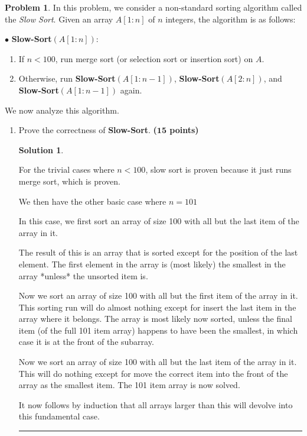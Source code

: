 \documentclass{article}
\theoremstyle{definition}
\newtheorem{problem}{Problem}
\def\fline{\rule{0.75\linewidth}{0.5pt}}
\newcommand{\finishline}{
  \begin{center}\fline
\end{center}}
\newtheorem*{solution*}{Solution}
\newenvironment{solution}{
\begin{solution*}}{{\finishline}
\end{solution*}}
\newcommand{\grade}[1]{\hfill{\textbf{($\mathbf{#1}$ points)}}}
\begin{document}
  \begin{problem}
    In this problem, we consider a non-standard sorting algorithm called the \emph{Slow Sort}. Given an array $A[1:n]$ of $n$ integers, the algorithm is as follows:

    $\bullet$ \textbf{Slow-Sort}$(A[1:n])$:
    \begin{enumerate}
      \item If $n < 100$, run merge sort (or selection sort or insertion sort) on $A$.
      \item Otherwise, run \textbf{Slow-Sort}$(A[1:n-1])$, \textbf{Slow-Sort}$(A[2:n])$, and \textbf{Slow-Sort}$(A[1:n-1])$ again.
    \end{enumerate}

    We now analyze this algorithm.

    \begin{enumerate}
      \item [(a)] Prove the correctness of  \textbf{Slow-Sort}. \grade{15}

        \begin{solution}
          \

          For the trivial cases where $n<100$, slow sort is proven because it just runs merge sort, which is proven. 
          

          We then have the other basic case where $n = 101$


          In this case, we first sort an array of size 100 with all but the last item of the array in it.


          The result of this is an array that is sorted except for the position of the last element. The first element in the array is (most likely) the smallest in the array *unless* the unsorted item is. 


          Now we sort an array of size 100 with all but the first item of the array in it. This sorting run will do almost nothing except for insert the last item in the array where it belongs. The array is most likely now sorted, unless the final item (of the full 101 item array) happens to have been the smallest, in which case it is at the front of the subarray.


          Now we sort an array of size 100 with all but the last item of the array in it. This will do nothing except for move the correct item into the front of the array as the smallest item. The 101 item array is now solved.


          It now follows by induction that all arrays larger than this will devolve into this fundamental case.
        \end{solution}


\end{enumerate}
\end{problem}
\end{document}
